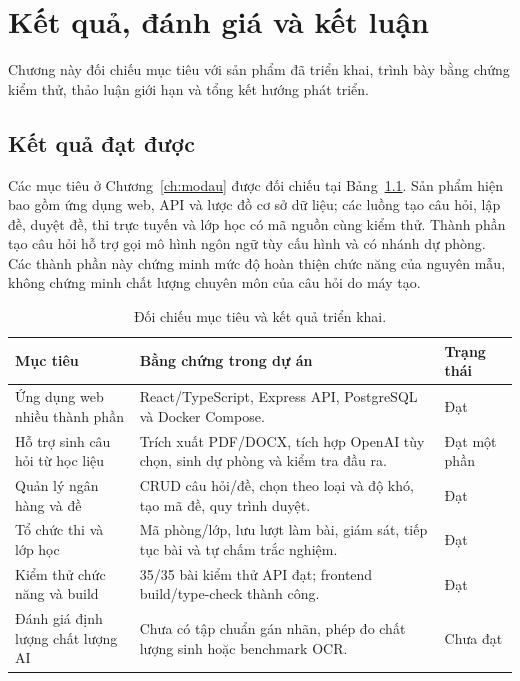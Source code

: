 \chapter{Kết quả, đánh giá và kết luận}
\label{ch:ketqua}

\begin{muctieu}
Chương này đối chiếu mục tiêu với sản phẩm đã triển khai, trình bày bằng
chứng kiểm thử, thảo luận giới hạn và tổng kết hướng phát triển.
\end{muctieu}

\section{Kết quả đạt được}

Các mục tiêu ở Chương~\ref{ch:modau} được đối chiếu tại
Bảng~\ref{tab:doichieu}. Sản phẩm hiện bao gồm ứng dụng web, API và lược đồ
cơ sở dữ liệu; các luồng tạo câu hỏi, lập đề, duyệt đề, thi trực tuyến và
lớp học có mã nguồn cùng kiểm thử. Thành phần tạo câu hỏi hỗ trợ gọi mô
hình ngôn ngữ tùy cấu hình và có nhánh dự phòng. Các thành phần này chứng
minh mức độ hoàn thiện chức năng của nguyên mẫu, không chứng minh chất lượng
chuyên môn của câu hỏi do máy tạo.

\begin{table}[H]
\centering
\caption{Đối chiếu mục tiêu và kết quả triển khai.}
\label{tab:doichieu}
\begin{tabular*}{\textwidth}{@{\extracolsep{\fill}}p{}p{}p{}}
\toprule
\rowcolor{gray100}\bfseries\color{daunavy}Mục tiêu & \bfseries\color{daunavy}Bằng chứng trong dự án & \bfseries\color{daumaroon}Trạng thái \\
\midrule
Ứng dụng web nhiều thành phần & React/TypeScript, Express API, PostgreSQL và Docker Compose. & Đạt \\
Hỗ trợ sinh câu hỏi từ học liệu & Trích xuất PDF/DOCX, tích hợp OpenAI tùy chọn, sinh dự phòng và kiểm tra đầu ra. & Đạt một phần \\
Quản lý ngân hàng và đề & CRUD câu hỏi/đề, chọn theo loại và độ khó, tạo mã đề, quy trình duyệt. & Đạt \\
Tổ chức thi và lớp học & Mã phòng/lớp, lưu lượt làm bài, giám sát, tiếp tục bài và tự chấm trắc nghiệm. & Đạt \\
Kiểm thử chức năng và build & 35/35 bài kiểm thử API đạt; frontend build/type-check thành công. & Đạt \\
Đánh giá định lượng chất lượng AI & Chưa có tập chuẩn gán nhãn, phép đo chất lượng sinh hoặc benchmark OCR. & Chưa đạt \\
\bottomrule
\end{tabular*}
\end{table}

